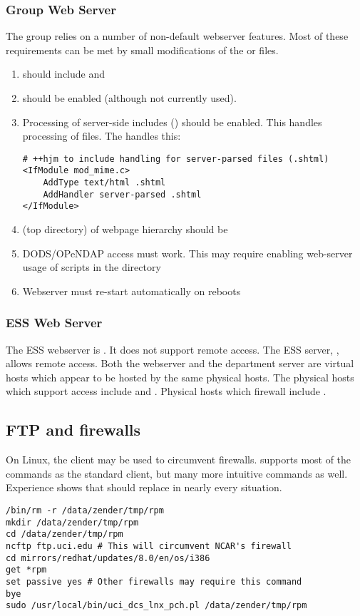 \documentclass[12pt,twoside]{article}
\begin{document}
\subsubsection{Group Web Server}\label{sxn:www_grp}
The group relies on a number of non-default webserver features.
Most of these requirements can be met by small modifications of the
 or  files.
\begin{enumerate}
\item {} should include  and
\item {} should be enabled (although not currently used). 
\item Processing of server-side includes () should be enabled.
  This handles processing of  files.
  The  handles this:
\begin{verbatim}
# ++hjm to include handling for server-parsed files (.shtml)
<IfModule mod_mime.c>
    AddType text/html .shtml
    AddHandler server-parsed .shtml
</IfModule>
\end{verbatim}
\item {} (top directory) of webpage hierarchy
  should be  
\item DODS/OPeNDAP access must work.
  This may require enabling web-server usage of  scripts 
  in the  directory
\item Webserver must re-start automatically on reboots
\end{enumerate}

\subsubsection{ESS Web Server}\label{sxn:www_ess}
The ESS webserver is .
It does not support remote  access.
The ESS server, , allows remote  
access. 
Both the webserver and the department server are virtual hosts
which appear to be hosted by the same physical hosts.
The physical hosts which support  access include
 and .
Physical hosts which firewall  include
.

\subsection{FTP and firewalls}\label{sxn:ftp}
On Linux, the  client may be used to circumvent firewalls.
 supports most of the commands as the standard 
client, but many more intuitive commands as well.
Experience shows that  should replace  in nearly
every situation.
\begin{verbatim}
/bin/rm -r /data/zender/tmp/rpm
mkdir /data/zender/tmp/rpm
cd /data/zender/tmp/rpm
ncftp ftp.uci.edu # This will circumvent NCAR's firewall
cd mirrors/redhat/updates/8.0/en/os/i386
get *rpm
set passive yes # Other firewalls may require this command
bye
sudo /usr/local/bin/uci_dcs_lnx_pch.pl /data/zender/tmp/rpm
\end{verbatim}
\end{document}
